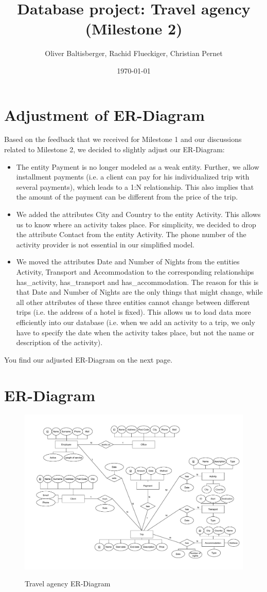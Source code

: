 \documentclass{article}
\title{Database project: Travel agency \\ (Milestone 2)}
\author{Oliver Baltisberger, Rachid Flueckiger, Christian Pernet}
\date{\today}
\begin{document}
	\maketitle
	
	\section*{Adjustment of ER-Diagram}
	Based on the feedback that we received for Milestone 1 and our discussions related to Milestone 2, we decided to slightly adjust our ER-Diagram:
	\begin{itemize}
		\item The entity Payment is no longer modeled as a weak entity. Further, we allow installment payments (i.e. a client can pay for his individualized trip with several payments), which leads to a 1:N relationship.
		This also implies that the amount of the payment can be different from the price of the trip.
		\item We added the attributes City and Country to the entity Activity. This allows us to know where an activity takes place.
		For simplicity, we decided to drop the attribute Contact from the entity Activity. The phone number of the activity provider is not essential in our simplified model.
		\item We moved the attributes Date and Number of Nights from the entities Activity, Transport and Accommodation to the corresponding relationships has\_activity, has\_transport and has\_accommodation.
		The reason for this is that Date and Number of Nights are the only things that might change, while all other attributes of these three entities cannot change between different trips (i.e. the address of a hotel is fixed).
		This allows us to load data more efficiently into our database (i.e. when we add an activity to a trip, we only have to specify the date when the activity takes place, but not the name or description of the activity).
	\end{itemize}
	
You find our adjusted ER-Diagram on the next page.
	\newpage
	
	\section*{ER-Diagram}
	\begin{figure}[htbp]
		\centering
			\includegraphics[width=1.15\textwidth, angle=90]{../Diagramm.pdf}
		\label{ER-Model}
		\caption{Travel agency ER-Diagram}
	\end{figure}
	
\end{document}
